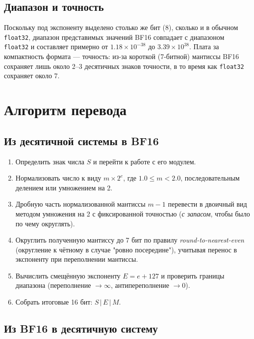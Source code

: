 \documentclass[12pt,a4paper]{article}
\begin{document}
\subsection{Диапазон и точность}

Поскольку под экспоненту выделено столько же бит (8), сколько и в
обычном \texttt{float32}, диапазон представимых значений BF16 совпадает
с диапазоном \texttt{float32} и составляет примерно от $1.18 \times 10^{-38}$
до $3.39 \times 10^{38}$. Плата за компактность формата — точность:
из-за короткой (7-битной) мантиссы BF16 сохраняет лишь около 2--3
десятичных знаков точности, в то время как \texttt{float32} сохраняет
около 7.

\section{Алгоритм перевода}

\subsection{Из десятичной системы в BF16}

\begin{enumerate}
    \item Определить знак числа $S$ и перейти к работе с его модулем.
    \item Нормализовать число к виду $m \times 2^{e}$, где $1.0 \le m < 2.0$,
    последовательным делением или умножением на 2.
    \item Дробную часть нормализованной мантиссы $m - 1$ перевести
    в двоичный вид методом умножения на 2 с фиксированной точностью
    (\textit{с запасом}, чтобы было по чему округлять).
    \item Округлить полученную мантиссу до 7 бит по правилу
    \textit{round-to-nearest-even} (округление к чётному в случае
    "ровно посередине"), учитывая перенос в экспоненту при переполнении
    мантиссы.
    \item Вычислить смещённую экспоненту $E = e + 127$ и проверить границы
    диапазона (переполнение $\to \infty$, антипереполнение $\to 0$).
    \item Собрать итоговые 16 бит: $S \,|\, E \,|\, M$.
\end{enumerate}

\subsection{Из BF16 в десятичную систему}
\end{document}
